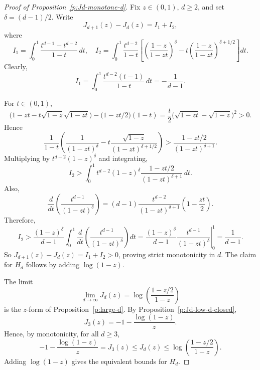 \documentclass{article}
\begin{document}
\begin{proof}[Proof of Proposition~\ref{p:Jd-monotone-d}]
Fix \(z\in(0,1)\), \(d\ge 2\), and set \(\delta=(d-1)/2\). Write
\[
J_{d+1}(z)-J_d(z)=I_1+I_2,
\]
where
\[
I_1=\int_0^1 \frac{t^{d-1}-t^{d-2}}{1-t}\,dt,
\quad
I_2=\int_0^1 \frac{t^{d-2}}{1-t}\left[
\left(\frac{1-z}{1-zt}\right)^\delta
-t\left(\frac{1-z}{1-zt}\right)^{\delta+1/2}
\right]dt.
\]
Clearly,
\[
I_1=\int_0^1 \frac{t^{d-2}(t-1)}{1-t}\,dt=-\frac{1}{d-1}.
\]

For \(t\in(0,1)\),
\[
\bigl(1-zt-t\sqrt{1-z}\sqrt{1-zt}\bigr)-\bigl(1-zt/2\bigr)(1-t)
=\frac{t}{2}\bigl(\sqrt{1-zt}-\sqrt{1-z}\bigr)^2>0.
\]
Hence
\[
\frac{1}{1-t}
\left(
\frac{1}{(1-zt)^\delta}
-t\frac{\sqrt{1-z}}{(1-zt)^{\delta+1/2}}
\right)
>\frac{1-zt/2}{(1-zt)^{\delta+1}}.
\]
Multiplying by \(t^{d-2}(1-z)^\delta\) and integrating,
\[
I_2>
\int_0^1 t^{d-2}(1-z)^\delta\frac{1-zt/2}{(1-zt)^{\delta+1}}\,dt.
\]
Also,
\[
\frac{d}{dt}\left(\frac{t^{d-1}}{(1-zt)^\delta}\right)
=(d-1)\frac{t^{d-2}}{(1-zt)^{\delta+1}}\left(1-\frac{zt}{2}\right).
\]
Therefore,
\[
I_2>
\frac{(1-z)^\delta}{d-1}
\int_0^1
\frac{d}{dt}\left(\frac{t^{d-1}}{(1-zt)^\delta}\right)dt
=\frac{(1-z)^\delta}{d-1}
\left.\frac{t^{d-1}}{(1-zt)^\delta}\right|_0^1
=\frac{1}{d-1}.
\]
So \(J_{d+1}(z)-J_d(z)=I_1+I_2>0\), proving strict monotonicity in \(d\).
The claim for \(H_d\) follows by adding \(\log(1-z)\).

The limit
\[
\lim_{d\to\infty}J_d(z)=\log\!\left(\frac{1-z/2}{1-z}\right)
\]
is the \(z\)-form of Proposition~\ref{p:large-d}. By Proposition~\ref{p:Jd-low-d-closed},
\[
J_3(z)=-1-\frac{\log(1-z)}{z}.
\]
Hence, by monotonicity, for all \(d\ge 3\),
\[
-1-\frac{\log(1-z)}{z}=J_3(z)\le J_d(z)\le
\log\!\left(\frac{1-z/2}{1-z}\right).
\]
Adding \(\log(1-z)\) gives the equivalent bounds for \(H_d\).
\end{proof}
\end{document}
